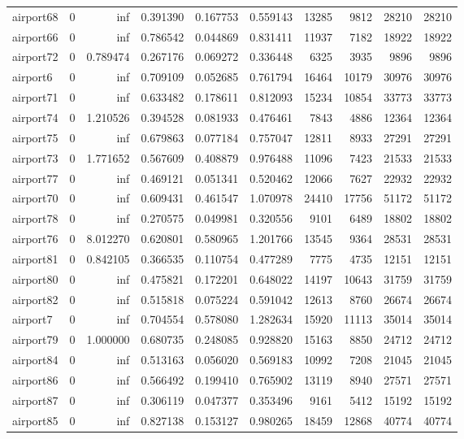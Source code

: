 \begin{longtable}{|l|r|r|r|r|r|r|r|r|r|}
airport68 & 0 & inf & 0.391390 & 0.167753 & 0.559143 & 13285 & 9812 & 28210 & 28210 \\
airport66 & 0 & inf & 0.786542 & 0.044869 & 0.831411 & 11937 & 7182 & 18922 & 18922 \\
airport72 & 0 & 0.789474 & 0.267176 & 0.069272 & 0.336448 & 6325 & 3935 & 9896 & 9896 \\
airport6 & 0 & inf & 0.709109 & 0.052685 & 0.761794 & 16464 & 10179 & 30976 & 30976 \\
airport71 & 0 & inf & 0.633482 & 0.178611 & 0.812093 & 15234 & 10854 & 33773 & 33773 \\
airport74 & 0 & 1.210526 & 0.394528 & 0.081933 & 0.476461 & 7843 & 4886 & 12364 & 12364 \\
airport75 & 0 & inf & 0.679863 & 0.077184 & 0.757047 & 12811 & 8933 & 27291 & 27291 \\
airport73 & 0 & 1.771652 & 0.567609 & 0.408879 & 0.976488 & 11096 & 7423 & 21533 & 21533 \\
airport77 & 0 & inf & 0.469121 & 0.051341 & 0.520462 & 12066 & 7627 & 22932 & 22932 \\
airport70 & 0 & inf & 0.609431 & 0.461547 & 1.070978 & 24410 & 17756 & 51172 & 51172 \\
airport78 & 0 & inf & 0.270575 & 0.049981 & 0.320556 & 9101 & 6489 & 18802 & 18802 \\
airport76 & 0 & 8.012270 & 0.620801 & 0.580965 & 1.201766 & 13545 & 9364 & 28531 & 28531 \\
airport81 & 0 & 0.842105 & 0.366535 & 0.110754 & 0.477289 & 7775 & 4735 & 12151 & 12151 \\
airport80 & 0 & inf & 0.475821 & 0.172201 & 0.648022 & 14197 & 10643 & 31759 & 31759 \\
airport82 & 0 & inf & 0.515818 & 0.075224 & 0.591042 & 12613 & 8760 & 26674 & 26674 \\
airport7 & 0 & inf & 0.704554 & 0.578080 & 1.282634 & 15920 & 11113 & 35014 & 35014 \\
airport79 & 0 & 1.000000 & 0.680735 & 0.248085 & 0.928820 & 15163 & 8850 & 24712 & 24712 \\
airport84 & 0 & inf & 0.513163 & 0.056020 & 0.569183 & 10992 & 7208 & 21045 & 21045 \\
airport86 & 0 & inf & 0.566492 & 0.199410 & 0.765902 & 13119 & 8940 & 27571 & 27571 \\
airport87 & 0 & inf & 0.306119 & 0.047377 & 0.353496 & 9161 & 5412 & 15192 & 15192 \\
airport85 & 0 & inf & 0.827138 & 0.153127 & 0.980265 & 18459 & 12868 & 40774 & 40774 \\

\end{longtable}
